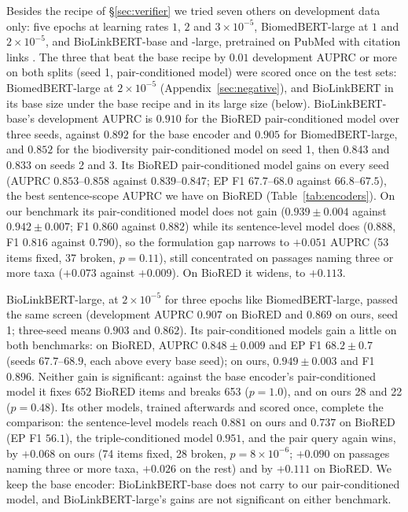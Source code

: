 \documentclass[11pt]{article}
\begin{document}
Besides the recipe of \S\ref{sec:verifier} we tried seven others on development data only: five
epochs at learning rates $1$, $2$ and $3\times10^{-5}$, BiomedBERT-large at $1$ and
$2\times10^{-5}$, and BioLinkBERT-base and -large, pretrained on PubMed with citation links
\citep{yasunaga2022linkbert}. The three that beat the base recipe by $0.01$ development AUPRC or more
on both splits (seed 1, pair-conditioned model) were scored once on the test sets: BiomedBERT-large
at $2\times10^{-5}$ (Appendix~\ref{sec:negative}), and BioLinkBERT in its base size under the base
recipe and in its large size (below). BioLinkBERT-base's development AUPRC is $0.910$ for the BioRED
pair-conditioned model over three seeds, against $0.892$ for the base encoder and $0.905$ for
BiomedBERT-large, and $0.852$ for the biodiversity pair-conditioned model on seed 1, then $0.843$ and
$0.833$ on seeds 2 and 3. Its BioRED pair-conditioned model gains on every seed (AUPRC
$0.853$--$0.858$ against $0.839$--$0.847$; EP F1 $67.7$--$68.0$ against $66.8$--$67.5$), the best
sentence-scope AUPRC we have on BioRED (Table~\ref{tab:encoders}). On our benchmark its
pair-conditioned model does not gain ($0.939 \pm 0.004$ against $0.942 \pm 0.007$; F1 $0.860$
against $0.882$) while its sentence-level model does ($0.888$, F1 $0.816$ against $0.790$), so the
formulation gap narrows to $+0.051$ AUPRC (53 items fixed, 37 broken, $p = 0.11$), still
concentrated on passages naming three or more taxa ($+0.073$ against $+0.009$). On BioRED it widens,
to $+0.113$.

BioLinkBERT-large, at $2\times10^{-5}$ for three epochs like BiomedBERT-large, passed the same screen
(development AUPRC $0.907$ on BioRED and $0.869$ on ours, seed 1; three-seed means $0.903$ and
$0.862$). Its pair-conditioned models gain a little on both benchmarks: on BioRED, AUPRC
$0.848 \pm 0.009$ and EP F1 $68.2 \pm 0.7$ (seeds $67.7$--$68.9$, each above every base seed); on
ours, $0.949 \pm 0.003$ and F1 $0.896$. Neither gain is significant: against the base encoder's
pair-conditioned model it fixes 652 BioRED items and breaks 653 ($p = 1.0$), and on ours 28 and 22
($p = 0.48$). Its other models, trained afterwards and scored once, complete the comparison: the
sentence-level models reach $0.881$ on ours and $0.737$ on BioRED (EP F1 $56.1$), the
triple-conditioned model $0.951$, and the pair query again wins, by $+0.068$ on ours (74 items
fixed, 28 broken, $p = 8\times10^{-6}$; $+0.090$ on passages naming three or more taxa, $+0.026$ on
the rest) and by $+0.111$ on BioRED. We keep the base encoder: BioLinkBERT-base does not carry to
our pair-conditioned model, and BioLinkBERT-large's gains are not significant on either benchmark.
\end{document}
